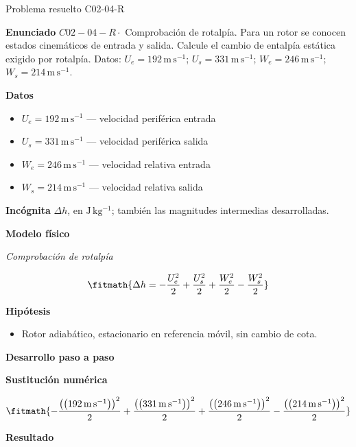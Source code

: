 \documentclass[10pt,openany]{book}
\begin{document}
\begin{studiumworked}{Problema resuelto C02-04-R}


\noindent\textbf{Enunciado}
\(C02-04-R \cdot\) Comprobación de rotalpía. Para un rotor se conocen estados cinemáticos de entrada y salida. Calcule el cambio de entalpía estática exigido por rotalpía. Datos: \(U_e=192\, \mathrm{m}\,\mathrm{s}^{-1}\); \(U_s=331\, \mathrm{m}\,\mathrm{s}^{-1}\); \(W_e=246\, \mathrm{m}\,\mathrm{s}^{-1}\); \(W_s=214\, \mathrm{m}\,\mathrm{s}^{-1}\).

\noindent\textbf{Datos}
\begin{itemize}
\item $U_e = 192\,\mathrm{m}\,\mathrm{s}^{-1}$ — velocidad periférica entrada
\item $U_s = 331\,\mathrm{m}\,\mathrm{s}^{-1}$ — velocidad periférica salida
\item $W_e = 246\,\mathrm{m}\,\mathrm{s}^{-1}$ — velocidad relativa entrada
\item $W_s = 214\,\mathrm{m}\,\mathrm{s}^{-1}$ — velocidad relativa salida
\end{itemize}

\noindent\textbf{Incógnita}
$\Delta h$, en $\mathrm{J\,kg^{-1}}$; también las magnitudes intermedias desarrolladas.

\noindent\textbf{Modelo físico}

\noindent\textit{Comprobación de rotalpía}

\[
\fitmath{\Delta h=- \frac{U_e^{2}}{2} + \frac{U_s^{2}}{2} + \frac{W_e^{2}}{2} - \frac{W_s^{2}}{2}}
\]

\noindent\textbf{Hipótesis}
\begin{itemize}
\item Rotor adiabático, estacionario en referencia móvil, sin cambio de cota.
\end{itemize}

\noindent\textbf{Desarrollo paso a paso}



\noindent\textbf{Sustitución numérica}

\[
\fitmath{- \frac{\left(\left(192\,\mathrm{m}\,\mathrm{s}^{-1}\right)\right)^{2}}{2} + \frac{\left(\left(331\,\mathrm{m}\,\mathrm{s}^{-1}\right)\right)^{2}}{2} + \frac{\left(\left(246\,\mathrm{m}\,\mathrm{s}^{-1}\right)\right)^{2}}{2} - \frac{\left(\left(214\,\mathrm{m}\,\mathrm{s}^{-1}\right)\right)^{2}}{2}}
\]

\noindent\textbf{Resultado}


\end{studiumworked}
\end{document}
